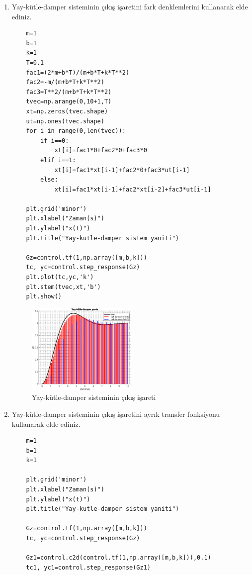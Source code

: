 \begin{enumerate}
    \item Yay-kütle-damper sisteminin çıkış işaretini fark denklemlerini kullanarak elde ediniz. 
    \begin{lstlisting}
    m=1
    b=1
    k=1
    T=0.1
    fac1=(2*m+b*T)/(m+b*T+k*T**2)
    fac2=-m/(m+b*T+k*T**2)
    fac3=T**2/(m+b*T+k*T**2)
    tvec=np.arange(0,10+1,T)
    xt=np.zeros(tvec.shape)
    ut=np.ones(tvec.shape)
    for i in range(0,len(tvec)):
        if i==0:
            xt[i]=fac1*0+fac2*0+fac3*0
        elif i==1:
            xt[i]=fac1*xt[i-1]+fac2*0+fac3*ut[i-1]
        else:
            xt[i]=fac1*xt[i-1]+fac2*xt[i-2]+fac3*ut[i-1]

    plt.grid('minor')
    plt.xlabel("Zaman(s)")
    plt.ylabel("x(t)")
    plt.title("Yay-kutle-damper sistem yaniti")

    Gz=control.tf(1,np.array([m,b,k]))
    tc, yc=control.step_response(Gz)
    plt.plot(tc,yc,'k')
    plt.stem(tvec,xt,'b')
    plt.show()
    \end{lstlisting}

    \begin{figure}[!htb]
        \centering
        \includegraphics[width=0.5\textwidth]{img/lec3_step1}
        \caption{Yay-kütle-damper sisteminin çıkış işareti}
        \label{fig:lec3_step1}
    \end{figure}
    \item Yay-kütle-damper sisteminin çıkış işaretini ayrık transfer fonksiyonu kullanarak elde ediniz. 
    \begin{lstlisting}
    m=1
    b=1
    k=1
    
    plt.grid('minor')
    plt.xlabel("Zaman(s)")
    plt.ylabel("x(t)")
    plt.title("Yay-kutle-damper sistem yaniti")

    Gz=control.tf(1,np.array([m,b,k]))
    tc, yc=control.step_response(Gz)

    Gz1=control.c2d(control.tf(1,np.array([m,b,k])),0.1)
    tc1, yc1=control.step_response(Gz1)


\end{lstlisting}
\end{enumerate}
